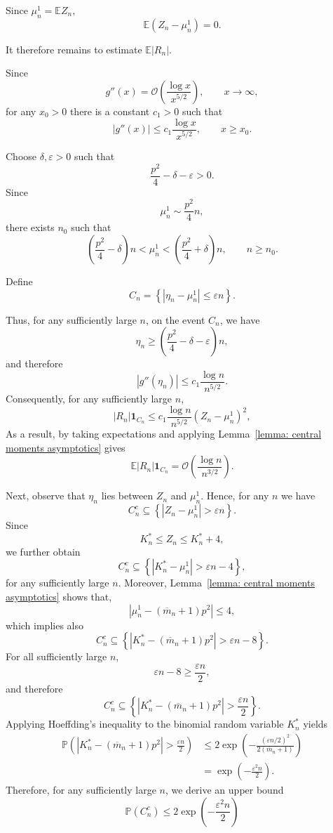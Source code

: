 \documentclass[12pt]{article}
\newcommand{\1}{\mathbf{1}}
\begin{document}
Since
$\mu_n^1=\mathbb EZ_n$,
\begin{equation}\label{eq:mean-term}
\mathbb E(Z_n-\mu_n^1)=0.
\end{equation}

It therefore remains to estimate
$\mathbb E|R_n|$.

Since
\[
g''(x)
=
\mathcal O
\!\left(
\frac{\log x}{x^{5/2}}
\right),
\qquad
x\to\infty,
\]
for any $x_0>0$ there is a constant
$c_1>0$
such that
\[
|g''(x)|
\le
c_1
\frac{\log x}{x^{5/2}},
\qquad
x\ge x_0.
\]

Choose
$\delta,\varepsilon>0$
such that
\[
\frac{p^2}{4}-\delta-\varepsilon>0.
\]
Since
\[
\mu_n^1
\sim
\frac{p^2}{4}n,
\]
there exists
$n_0$
such that
\[
\left(
\frac{p^2}{4}-\delta
\right)n
<
\mu_n^1
<
\left(
\frac{p^2}{4}+\delta
\right)n,
\qquad
n\ge n_0.
\]

Define
\[
C_n
=
\left\{
|\eta_n-\mu_n^1|
\le
\varepsilon n
\right\}.
\]

Thus, for any sufficiently large $n$, on the event
$C_n$,
we have
\[
\eta_n
\ge
\left(
\frac{p^2}{4}
-
\delta
-
\varepsilon
\right)n,
\]
and therefore
\[
|g''(\eta_n)|
\le
c_1
\frac{\log n}{n^{5/2}}.
\]
Consequently, for any sufficiently large $n$,
\[
|R_n|
\mathbf1_{C_n}
\le
c_1
\frac{\log n}{n^{5/2}}
(Z_n-\mu_n^1)^2,
\]
As a result, by taking expectations and applying
Lemma~\ref{lemma: central moments asymptotics}
gives
\begin{equation}\label{eq:R-A}
\mathbb E
|R_n|
\mathbf1_{C_n}
=
\mathcal O
\!\left(
\frac{\log n}{n^{3/2}}
\right).
\end{equation}

Next, observe that
$\eta_n$
lies between
$Z_n$
and
$\mu_n^1$.
Hence, for any $n$ we have
\[
C_n^c
\subseteq
\left\{
|Z_n-\mu_n^1|
>
\varepsilon n
\right\}.
\]
Since
\[
K_n^*
\le
Z_n
\le
K_n^*+4,
\]
we further obtain
\[
C_n^c
\subseteq
\left\{
|K_n^*-\mu_n^1|
>
\varepsilon n-4
\right\},
\]
for any sufficiently large $n$.
Moreover,
Lemma~\ref{lemma: central moments asymptotics}
shows that,
\[
|\mu_n^1-(\overline m_n+1)p^2|
\le4,
\]
which implies also
\[
C_n^c
\subseteq
\left\{
|K_n^*-(\overline m_n+1)p^2|
>
\varepsilon n-8
\right\}.
\]
For all sufficiently large
$n$,
\[
\varepsilon n-8
\ge
\frac{\varepsilon n}{2},
\]
and therefore
\[
C_n^c
\subseteq
\left\{
|K_n^*-(\overline m_n+1)p^2|
>
\frac{\varepsilon n}{2}
\right\}.
\]
Applying Hoeffding's inequality to the
binomial random variable $K_n^*$ yields
\begin{align*}
    \mathbb P
\!\left(
|K_n^*-(\overline m_n+1)p^2|
>
\frac{\varepsilon n}{2}
\right)
&\le
2
\exp
\!\left(
-
\frac{(\varepsilon n/2)^2}
{2(\overline m_n+1)}
\right)
\\[4pt]&=
\exp
\!\left(
-
\frac{\varepsilon^2n}
{2}
\right)
.
\end{align*}
Therefore, for any sufficiently large $n$, we derive an upper bound
\begin{equation}\label{eq:Hoeffding-An}
\mathbb P(C_n^c)
\le
2
\exp
\!\left(
-
\frac{\varepsilon^2n}
{2}
\right)
\end{equation}
\end{document}
